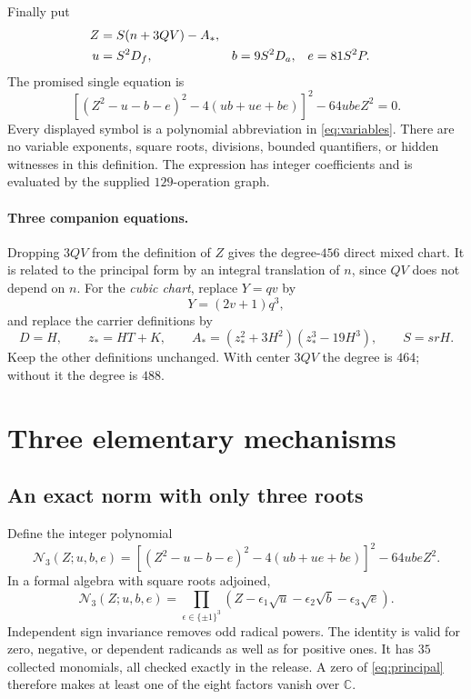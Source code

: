 \documentclass[11pt]{article}
\newcommand{\Norm}{\mathcal N_3}
\theoremstyle{definition}
\theoremstyle{remark}
\begin{document}
Finally put
\begin{align}
 Z&=S(n+3QV)-A_*,\notag\\
 u&=S^2D_f,&b&=9S^2D_a,&e&=81S^2P.\label{eq:radicands}
\end{align}
The promised single equation is
\begin{equation}\label{eq:principal}
 \boxed{\quad
 \left[(Z^2-u-b-e)^2-4(ub+ue+be)\right]^2
       -64ubeZ^2=0.
 \quad}
\end{equation}
Every displayed symbol is a polynomial abbreviation in
\eqref{eq:variables}. There are no variable exponents, square roots,
divisions, bounded quantifiers, or hidden witnesses in this definition.
The expression has integer coefficients and is evaluated by the supplied
$129$-operation graph.

\paragraph{Three companion equations.}
Dropping $3QV$ from the definition of $Z$ gives the degree-$456$ direct
mixed chart. It is related to the principal form by an integral
translation of $n$, since $QV$ does not depend on $n$.
For the \emph{cubic chart}, replace $Y=qv$ by
\[
 Y=(2v+1)q^3,
\]
and replace the carrier definitions by
\begin{equation}\label{eq:cubiccarrier}
 D=H,\qquad z_*=HT+K,\qquad
 A_*=(z_*^2+3H^2)(z_*^3-19H^3),\qquad S=srH.
\end{equation}
Keep the other definitions unchanged. With center $3QV$ the degree is
$464$; without it the degree is $488$.

\section{Three elementary mechanisms}
\label{sec:mechanisms}

\subsection{An exact norm with only three roots}
Define the integer polynomial
\begin{equation}\label{eq:norm3}
 \Norm(Z;u,b,e)=
 \left[(Z^2-u-b-e)^2-4(ub+ue+be)\right]^2-64ubeZ^2.
\end{equation}
In a formal algebra with square roots adjoined,
\begin{equation}\label{eq:normproduct}
 \Norm(Z;u,b,e)=
 \prod_{\epsilon\in\{\pm1\}^3}
 \left(Z-\epsilon_1\sqrt u-\epsilon_2\sqrt b-
                   \epsilon_3\sqrt e\right).
\end{equation}
Independent sign invariance removes odd radical powers. The identity
is valid for zero, negative, or dependent radicands as well as for
positive ones. It has $35$ collected monomials, all checked exactly in
the release. A zero of \eqref{eq:principal} therefore makes at least
one of the eight factors vanish over $\mathbb C$.
\end{document}

